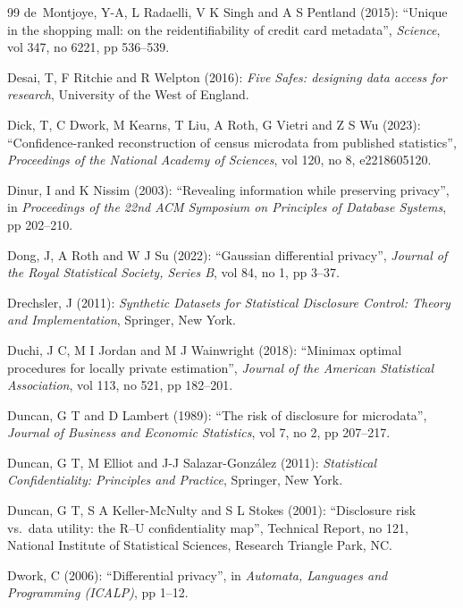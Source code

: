 \documentclass[11pt,a4paper]{article}
\theoremstyle{plain}
\theoremstyle{definition}
\theoremstyle{definition}
\theoremstyle{plain}
\begin{document}
\begin{thebibliography}{99}
de~Montjoye, Y-A, L Radaelli, V K Singh and A S Pentland (2015): ``Unique in the shopping mall: on the reidentifiability of credit card metadata'', \emph{Science}, vol 347, no 6221, pp 536--539.

Desai, T, F Ritchie and R Welpton (2016): \emph{Five Safes: designing data access for research}, University of the West of England.

Dick, T, C Dwork, M Kearns, T Liu, A Roth, G Vietri and Z S Wu (2023): ``Confidence-ranked reconstruction of census microdata from published statistics'', \emph{Proceedings of the National Academy of Sciences}, vol 120, no 8, e2218605120.

Dinur, I and K Nissim (2003): ``Revealing information while preserving privacy'', in \emph{Proceedings of the 22nd ACM Symposium on Principles of Database Systems}, pp 202--210.

Dong, J, A Roth and W J Su (2022): ``Gaussian differential privacy'', \emph{Journal of the Royal Statistical Society, Series B}, vol 84, no 1, pp 3--37.

Drechsler, J (2011): \emph{Synthetic Datasets for Statistical Disclosure Control: Theory and Implementation}, Springer, New York.

Duchi, J C, M I Jordan and M J Wainwright (2018): ``Minimax optimal procedures for locally private estimation'', \emph{Journal of the American Statistical Association}, vol 113, no 521, pp 182--201.

Duncan, G T and D Lambert (1989): ``The risk of disclosure for microdata'', \emph{Journal of Business and Economic Statistics}, vol 7, no 2, pp 207--217.

Duncan, G T, M Elliot and J-J Salazar-Gonz\'alez (2011): \emph{Statistical Confidentiality: Principles and Practice}, Springer, New York.

Duncan, G T, S A Keller-McNulty and S L Stokes (2001): ``Disclosure risk vs.\ data utility: the R--U confidentiality map'', Technical Report, no 121, National Institute of Statistical Sciences, Research Triangle Park, NC.

Dwork, C (2006): ``Differential privacy'', in \emph{Automata, Languages and Programming (ICALP)}, pp 1--12.


\end{thebibliography}
\end{document}
